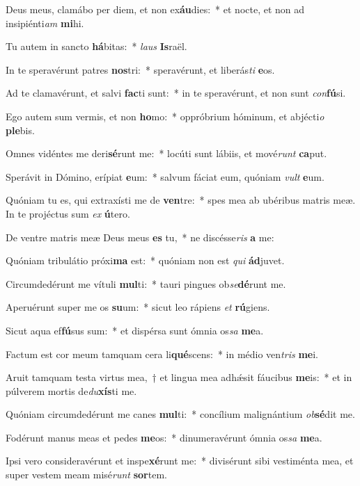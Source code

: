 \item Deus meus, clamábo per diem, et non ex\textbf{áu}dies:~* et nocte, et non ad insipiénti\textit{am} \textbf{mi}hi.
\item Tu autem in sancto \textbf{há}bitas:~* \textit{laus} \textbf{Is}raël.
\item In te speravérunt patres \textbf{nos}tri:~* speravérunt, et liberás\textit{ti} \textbf{e}os.
\item Ad te clamavérunt, et salvi \textbf{fac}ti sunt:~* in te speravérunt, et non sunt \textit{con}\textbf{fú}si.
\item Ego autem sum vermis, et non \textbf{ho}mo:~* oppróbrium hóminum, et abjécti\textit{o} \textbf{ple}bis.
\item Omnes vidéntes me deri\textbf{sé}runt me:~* locúti sunt lábiis, et mové\textit{runt} \textbf{ca}put.
\item Sperávit in Dómino, erípiat \textbf{e}um:~* salvum fáciat eum, quóniam \textit{vult} \textbf{e}um.
\item Quóniam tu es, qui extraxísti me de \textbf{ven}tre:~* spes mea ab ubéribus matris meæ. In te projéctus sum \textit{ex} \textbf{ú}tero.
\item De ventre matris meæ Deus meus \textbf{es} tu,~* ne discésse\textit{ris} \textbf{a} me:
\item Quóniam tribulátio próxi\textbf{ma} est:~* quóniam non est \textit{qui} \textbf{ád}juvet.
\item Circumdedérunt me vítuli \textbf{mul}ti:~* tauri pingues ob\textit{se}\textbf{dé}runt me.
\item Aperuérunt super me os \textbf{su}um:~* sicut leo rápiens \textit{et} \textbf{rú}giens.
\item Sicut aqua ef\textbf{fú}sus sum:~* et dispérsa sunt ómnia os\textit{sa} \textbf{me}a.
\item Factum est cor meum tamquam cera li\textbf{qué}scens:~* in médio ven\textit{tris} \textbf{me}i.
\item Aruit tamquam testa virtus mea,~† et lingua mea adhǽsit fáucibus \textbf{me}is:~* et in púlverem mortis de\textit{du}\textbf{xís}ti me.
\item Quóniam circumdedérunt me canes \textbf{mul}ti:~* concílium malignántium \textit{ob}\textbf{sé}dit me.
\item Fodérunt manus meas et pedes \textbf{me}os:~* dinumeravérunt ómnia os\textit{sa} \textbf{me}a.
\item Ipsi vero consideravérunt et inspe\textbf{xé}runt me:~* divisérunt sibi vestiménta mea, et super vestem meam misé\textit{runt} \textbf{sor}tem.
